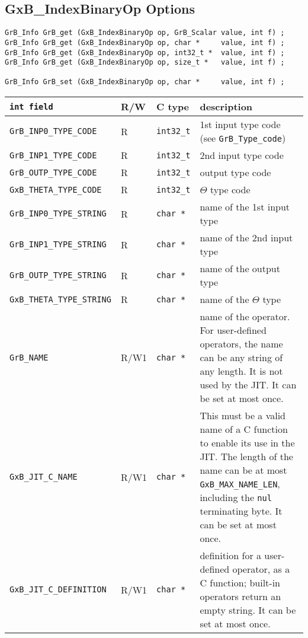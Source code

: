 
\newpage
\subsection{{\sf GxB\_IndexBinaryOp} Options}
\label{get_set_idxbinop}

\begin{mdframed}[userdefinedwidth=6in]
{\footnotesize
\begin{verbatim}
GrB_Info GrB_get (GxB_IndexBinaryOp op, GrB_Scalar value, int f) ;
GrB_Info GrB_get (GxB_IndexBinaryOp op, char *     value, int f) ;
GrB_Info GrB_get (GxB_IndexBinaryOp op, int32_t *  value, int f) ;
GrB_Info GrB_get (GxB_IndexBinaryOp op, size_t *   value, int f) ;

GrB_Info GrB_set (GxB_IndexBinaryOp op, char *     value, int f) ;
\end{verbatim}
}\end{mdframed}

\noindent
{\small
\begin{tabular}{|l|l|l|p{2.8in}|}
\hline
\verb'int field'                    & R/W  & C type        & description \\
\hline
\verb'GrB_INP0_TYPE_CODE'          & R    & \verb'int32_t'& 1st input type code (see \verb'GrB_Type_code') \\
\verb'GrB_INP1_TYPE_CODE'          & R    & \verb'int32_t'& 2nd input type code \\
\verb'GrB_OUTP_TYPE_CODE'          & R    & \verb'int32_t'& output type code \\
\verb'GxB_THETA_TYPE_CODE'         & R    & \verb'int32_t'& $\Theta$ type code \\
\verb'GrB_INP0_TYPE_STRING'        & R    & \verb'char *' & name of the 1st input type \\
\verb'GrB_INP1_TYPE_STRING'        & R    & \verb'char *' & name of the 2nd input type \\
\verb'GrB_OUTP_TYPE_STRING'        & R    & \verb'char *' & name of the output type \\
\verb'GxB_THETA_TYPE_STRING'       & R    & \verb'char *' & name of the $\Theta$ type \\
\hline
\verb'GrB_NAME'                     & R/W1 & \verb'char *' &    %
    name of the operator.
    For user-defined operators, the name can be any string of any length.  It
    is not used by the JIT.  It can be set at most once. \\
\verb'GxB_JIT_C_NAME'               & R/W1 & \verb'char *' &
    This must be a valid name of a C function to enable its use in the JIT.
    The length of the name can be at most \verb'GxB_MAX_NAME_LEN', including
    the \verb'nul' terminating byte.  It can be set at most once. \\
\verb'GxB_JIT_C_DEFINITION'         & R/W1 & \verb'char *' &
    definition for a user-defined operator, as a C function; built-in operators
    return an empty string.  It can be set at most once. \\
\hline
\end{tabular}
}

